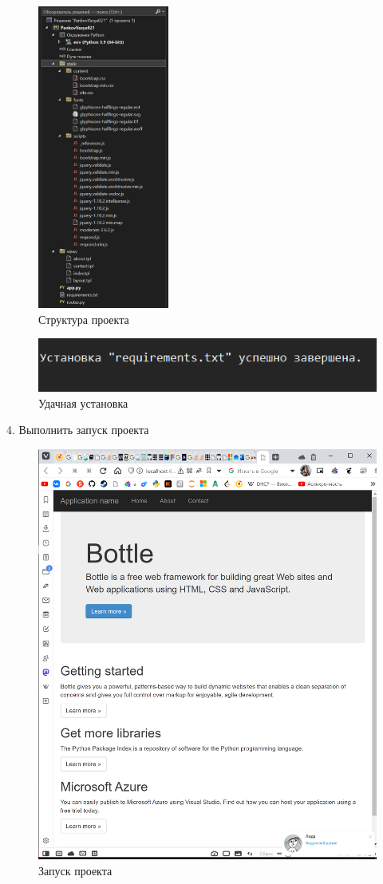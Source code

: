 \documentclass[14pt]{extarticle}
\begin{document}
\begin{figure}[H]
\centering
\includegraphics[height=10cm]{images/20230323-120758_screenshot.png}
\caption{Структура проекта}
\end{figure}

\begin{figure}[H]
\centering
\includegraphics[width=.9\linewidth]{images/20230323-121247_screenshot.png}
\caption{Удачная установка}
\end{figure}


​4. Выполнить запуск проекта

\begin{figure}[H]
\centering
\includegraphics[width=.9\linewidth]{images/20230323-121321_screenshot.png}
\caption{Запуск проекта}
\end{figure}
\end{document}
